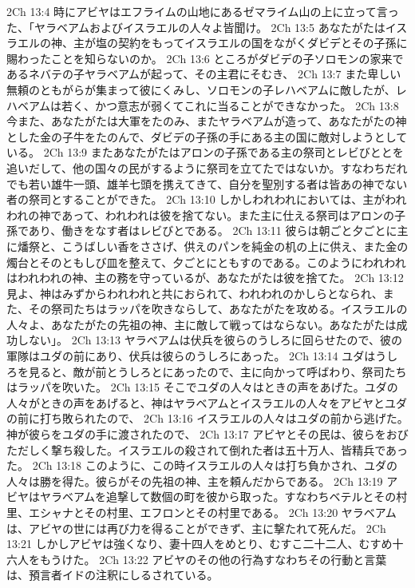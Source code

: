 2Ch 13:4  時にアビヤはエフライムの山地にあるゼマライム山の上に立って言った、「ヤラベアムおよびイスラエルの人々よ皆聞け。
2Ch 13:5  あなたがたはイスラエルの神、主が塩の契約をもってイスラエルの国をながくダビデとその子孫に賜わったことを知らないのか。
2Ch 13:6  ところがダビデの子ソロモンの家来であるネバテの子ヤラベアムが起って、その主君にそむき、
2Ch 13:7  また卑しい無頼のともがらが集まって彼にくみし、ソロモンの子レハベアムに敵したが、レハベアムは若く、かつ意志が弱くてこれに当ることができなかった。
2Ch 13:8  今また、あなたがたは大軍をたのみ、またヤラベアムが造って、あなたがたの神とした金の子牛をたのんで、ダビデの子孫の手にある主の国に敵対しようとしている。
2Ch 13:9  またあなたがたはアロンの子孫である主の祭司とレビびととを追いだして、他の国々の民がするように祭司を立てたではないか。すなわちだれでも若い雄牛一頭、雄羊七頭を携えてきて、自分を聖別する者は皆あの神でない者の祭司とすることができた。
2Ch 13:10  しかしわれわれにおいては、主がわれわれの神であって、われわれは彼を捨てない。また主に仕える祭司はアロンの子孫であり、働きをなす者はレビびとである。
2Ch 13:11  彼らは朝ごと夕ごとに主に燔祭と、こうばしい香をささげ、供えのパンを純金の机の上に供え、また金の燭台とそのともしび皿を整えて、夕ごとにともすのである。このようにわれわれはわれわれの神、主の務を守っているが、あなたがたは彼を捨てた。
2Ch 13:12  見よ、神はみずからわれわれと共におられて、われわれのかしらとなられ、また、その祭司たちはラッパを吹きならして、あなたがたを攻める。イスラエルの人々よ、あなたがたの先祖の神、主に敵して戦ってはならない。あなたがたは成功しない」。
2Ch 13:13  ヤラベアムは伏兵を彼らのうしろに回らせたので、彼の軍隊はユダの前にあり、伏兵は彼らのうしろにあった。
2Ch 13:14  ユダはうしろを見ると、敵が前とうしろとにあったので、主に向かって呼ばわり、祭司たちはラッパを吹いた。
2Ch 13:15  そこでユダの人々はときの声をあげた。ユダの人々がときの声をあげると、神はヤラベアムとイスラエルの人々をアビヤとユダの前に打ち敗られたので、
2Ch 13:16  イスラエルの人々はユダの前から逃げた。神が彼らをユダの手に渡されたので、
2Ch 13:17  アビヤとその民は、彼らをおびただしく撃ち殺した。イスラエルの殺されて倒れた者は五十万人、皆精兵であった。
2Ch 13:18  このように、この時イスラエルの人々は打ち負かされ、ユダの人々は勝を得た。彼らがその先祖の神、主を頼んだからである。
2Ch 13:19  アビヤはヤラベアムを追撃して数個の町を彼から取った。すなわちベテルとその村里、エシャナとその村里、エフロンとその村里である。
2Ch 13:20  ヤラベアムは、アビヤの世には再び力を得ることができず、主に撃たれて死んだ。
2Ch 13:21  しかしアビヤは強くなり、妻十四人をめとり、むすこ二十二人、むすめ十六人をもうけた。
2Ch 13:22  アビヤのその他の行為すなわちその行動と言葉は、預言者イドの注釈にしるされている。
